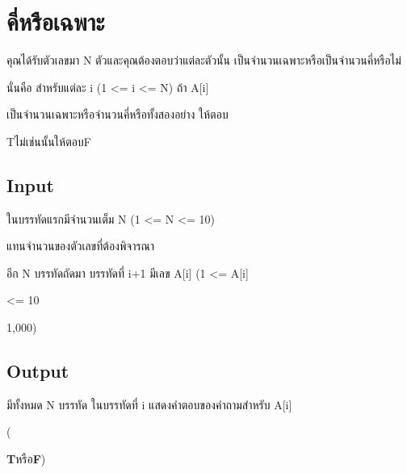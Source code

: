 \documentclass{article}
\begin{document}
\section*{คี่หรือเฉพาะ}

{คุณได้รับตัวเลขมา N ตัวและคุณต้องตอบว่าแต่ละตัวนั้น เป็นจำนวนเฉพาะหรือเป็นจำนวนคี่หรือไม่}



{นั่นคือ สำหรับแต่ละ i (1 \textless= i \textless= N) ถ้า A{[}i{]}

เป็นจำนวนเฉพาะหรือจำนวนคี่หรือทั้งสองอย่าง ให้ตอบ}T{ไม่เช่นนั้นให้ตอบ}F\\



\subsection*{Input}
{ในบรรทัดแรกมีจำนวนเต็ม N (1 \textless= N \textless= 10)

แทนจำนวนของตัวเลขที่ต้องพิจารณา}



{อีก N บรรทัดถัดมา บรรทัดที่ i+1 มีเลข A{[}i{]} (1 \textless= A{[}i{]}

\textless= 10}1,000{)}



\subsection*{Output}
{มีทั้งหมด N บรรทัด ในบรรทัดที่ i แสดงคำตอบของคำถามสำหรับ A{[}i{]}

(}\textbf{T}{หรือ}\textbf{F}{)}\\
\end{document}
